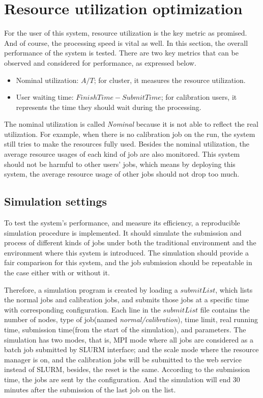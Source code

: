 \section{Resource utilization optimization}
For the user of this system, resource utilization is the key metric as promised.
And of course, the processing speed is vital as well. In this section, the overall performance of the system is tested.
There are two key metrics that can be observed and considered for performance, as expressed below.
\begin{itemize}
    \item Nominal utilization: $A/T$; for cluster, it measures the resource utilization.
    \item User waiting time: $FinishTime-SubmitTime$; for calibration users, it represents the time they should wait during the processing.
\end{itemize}
The nominal utilization is called \textit{Nominal} because it is not able to reflect the real utilization.
For example, when there is no calibration job on the run, the system still tries to make the resources fully used.
Besides the nominal utilization, the average resource usages of each kind of job are also monitored.
This system should not be harmful to other users’ jobs, which means by deploying this system, the average resource usage of other jobs should not drop too much.

\subsection{Simulation settings}
To test the system’s performance, and measure its efficiency, a reproducible simulation procedure is implemented.
It should simulate the submission and process of different kinds of jobs under both the traditional environment and the environment where this system is introduced.
The simulation should provide a fair comparison for this system, and the job submission should be repeatable in the case either with or without it.

Therefore, a simulation program is created by loading a $submitList$, which lists the normal jobs and calibration jobs, and submits those jobs at a specific time with corresponding configuration. 
Each line in the $submitList$ file contains the number of nodes, type of job(named \textit{normal/calibration}), time limit, real running time, submission time(from the start of the simulation), and parameters.
The simulation has two modes, that is, MPI mode where all jobs are considered as a batch job submitted by SLURM interface; and the scale mode where the resource manager is on, and the calibration jobs will be submitted to the web service instead of SLURM, besides, the reset is the same.
According to the submission time, the jobs are sent by the configuration. 
And the simulation will end 30 minutes after the submission of the last job on the list.

